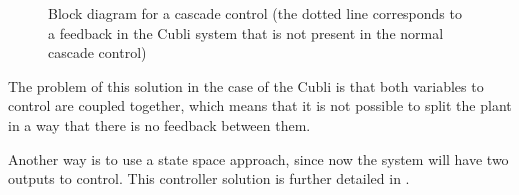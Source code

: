 \begin{figure}[H]
	
	\centering
	\caption{Block diagram for a cascade control (the dotted line corresponds to a feedback in the Cubli system that is not present in the normal cascade control)}
	\label{cascadeControl}
\end{figure}

The problem of this solution in the case of the Cubli is that both variables to control are coupled together, which means that it is not possible to split the plant in a way that there is no feedback between them.\cite{LRusso}

Another way is to use a state space approach, since now the system will have two outputs to control. This controller solution is further detailed in .
